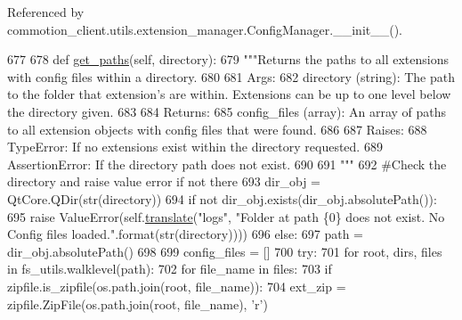 Referenced by commotion\+\_\+client.\+utils.\+extension\+\_\+manager.\+Config\+Manager.\+\_\+\+\_\+init\+\_\+\+\_\+().


\begin{DoxyCode}
677 
678     \textcolor{keyword}{def }\hyperlink{classcommotion__client_1_1utils_1_1extension__manager_1_1ConfigManager_ac8075c8f0e46b33f63c4b79f91d2ee3e}{get\_paths}(self, directory):
679         \textcolor{stringliteral}{"""Returns the paths to all extensions with config files within a directory.}
680 \textcolor{stringliteral}{        }
681 \textcolor{stringliteral}{        Args:}
682 \textcolor{stringliteral}{          directory (string): The path to the folder that extension's are within. Extensions can be up to
       one level below the directory given.}
683 \textcolor{stringliteral}{        }
684 \textcolor{stringliteral}{        Returns:}
685 \textcolor{stringliteral}{          config\_files (array): An array of paths to all extension objects with config files that were
       found.}
686 \textcolor{stringliteral}{        }
687 \textcolor{stringliteral}{        Raises:}
688 \textcolor{stringliteral}{          TypeError: If no extensions exist within the directory requested.}
689 \textcolor{stringliteral}{          AssertionError: If the directory path does not exist.}
690 \textcolor{stringliteral}{        }
691 \textcolor{stringliteral}{        """}
692         \textcolor{comment}{#Check the directory and raise value error if not there}
693         dir\_obj = QtCore.QDir(str(directory))
694         \textcolor{keywordflow}{if} \textcolor{keywordflow}{not} dir\_obj.exists(dir\_obj.absolutePath()):
695             \textcolor{keywordflow}{raise} ValueError(self.\hyperlink{classcommotion__client_1_1utils_1_1extension__manager_1_1ConfigManager_aa0ce09aefdd36656f0a1abfad14e9ff1}{translate}(\textcolor{stringliteral}{"logs"}, \textcolor{stringliteral}{"Folder at path \{0\} does not exist. No Config
       files loaded."}.format(str(directory))))
696         \textcolor{keywordflow}{else}:
697             path = dir\_obj.absolutePath()
698 
699         config\_files = []
700         \textcolor{keywordflow}{try}:
701             \textcolor{keywordflow}{for} root, dirs, files \textcolor{keywordflow}{in} fs\_utils.walklevel(path):
702                 \textcolor{keywordflow}{for} file\_name \textcolor{keywordflow}{in} files:
703                     \textcolor{keywordflow}{if} zipfile.is\_zipfile(os.path.join(root, file\_name)):
704                         ext\_zip = zipfile.ZipFile(os.path.join(root, file\_name), \textcolor{stringliteral}{'}\textcolor{stringliteral}{r')}

\end{DoxyCode}
